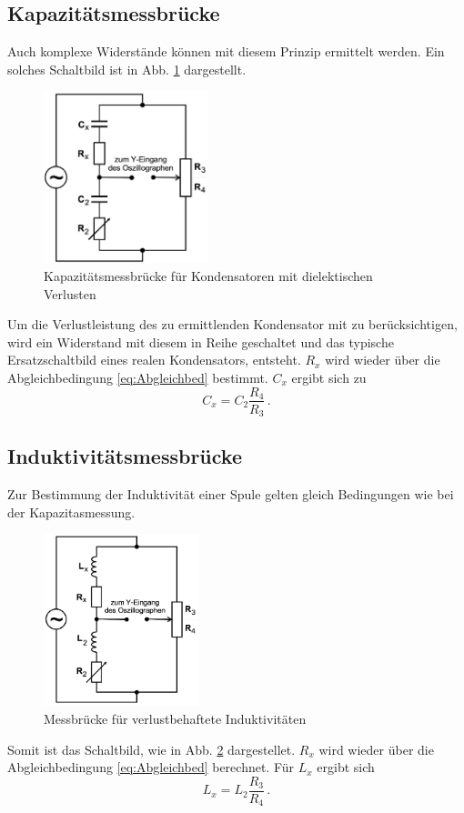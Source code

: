    \subsection{Kapazitätsmessbrücke}
    Auch komplexe Widerstände können mit diesem Prinzip ermittelt werden.
    Ein solches Schaltbild ist in Abb. \ref{fig:Kapatitaetsmessbruecke} dargestellt.
    \begin{figure}
        \centering
        \includegraphics[height= 5cm]{Messdaten/Kapazitaetsmessung.jpg}
        \caption{Kapazitätsmessbrücke für Kondensatoren mit dielektischen Verlusten}
        \label{fig:Kapatitaetsmessbruecke}
    \end{figure}
    Um die Verlustleistung des zu ermittlenden Kondensator mit zu berücksichtigen, wird ein Widerstand mit diesem in Reihe geschaltet
    und das typische Ersatzschaltbild eines realen Kondensators, entsteht.
    $R_x$ wird wieder über die Abgleichbedingung \ref{eq:Abgleichbed} bestimmt.
    $C_x$ ergibt sich zu
    \begin{equation}
         C_x = C_2 \frac{R_4}{R_3} \, \text{.}
         \label{eq:kapawiderstand}
    \end{equation}
    \subsection{Induktivitätsmessbrücke}
    Zur Bestimmung der Induktivität einer Spule gelten gleich Bedingungen wie bei der Kapazitasmessung.
    \begin{figure}
        \centering
        \includegraphics[height=5cm]{Induktivitaetsmessung.jpg}
        \caption{Messbrücke für verlustbehaftete Induktivitäten}
        \label{fig:Induktivitaetsmessbruecke}
    \end{figure}
    Somit ist das Schaltbild, wie in Abb. \ref{fig:Induktivitaetsmessbruecke} dargestellet.
    $R_x$ wird wieder über die Abgleichbedingung \eqref{eq:Abgleichbed} berechnet.
    Für $L_x$ ergibt sich
    \begin{equation}
        L_x = L_2 \frac{R_3}{R_4}\, \text{.}
        \label{eq:induktivität}
    \end{equation}
